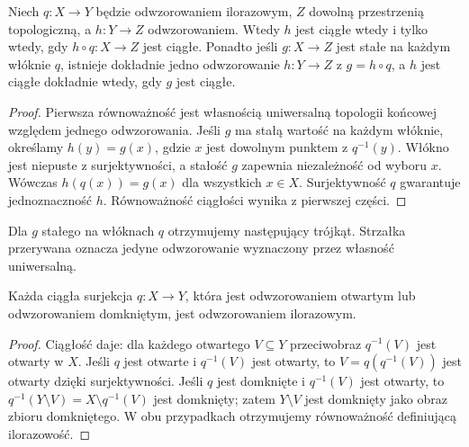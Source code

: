 \begin{twierdzenie}
\label{thm:topog-iloraz-uniwersalnosc}
Niech $q\colon X\to Y$ będzie odwzorowaniem ilorazowym,
$Z$ dowolną przestrzenią topologiczną, a $h\colon Y\to Z$
odwzorowaniem. Wtedy $h$ jest ciągłe wtedy i tylko wtedy,
gdy $h\circ q\colon X\to Z$ jest ciągłe.
Ponadto jeśli $g\colon X\to Z$ jest stałe na każdym
włóknie $q$, istnieje dokładnie jedno odwzorowanie
$h\colon Y\to Z$ z $g=h\circ q$, a $h$ jest ciągłe
dokładnie wtedy, gdy $g$ jest ciągłe.
\end{twierdzenie}


\begin{proof}
Pierwsza równoważność jest własnością uniwersalną
topologii końcowej względem jednego odwzorowania.
Jeśli $g$ ma stałą wartość na każdym włóknie, określamy
$h(y)=g(x)$, gdzie $x$ jest dowolnym punktem z
$q^{-1}(y)$. Włókno jest niepuste z surjektywności,
a stałość $g$ zapewnia niezależność od wyboru $x$.
Wówczas $h(q(x))=g(x)$ dla wszystkich $x\in X$.
Surjektywność $q$ gwarantuje jednoznaczność $h$.
Równoważność ciągłości wynika z pierwszej części.
\end{proof}

Dla $g$ stałego na włóknach $q$ otrzymujemy następujący trójkąt. Strzałka przerywana oznacza jedyne odwzorowanie wyznaczony przez własność uniwersalną.
\begin{center}
\end{center}

\begin{stwierdzenie}
\label{prop:topog-otwarta-surjekcja-iloraz}
Każda ciągła surjekcja $q\colon X\to Y$, która jest
odwzorowaniem otwartym lub odwzorowaniem domkniętym,
jest odwzorowaniem ilorazowym.
\end{stwierdzenie}
\begin{proof}
Ciągłość daje: dla każdego otwartego $V\subseteq Y$
przeciwobraz $q^{-1}(V)$ jest otwarty w $X$.
Jeśli $q$ jest otwarte i $q^{-1}(V)$ jest otwarty,
to $V=q(q^{-1}(V))$ jest otwarty dzięki surjektywności.
Jeśli $q$ jest domknięte i $q^{-1}(V)$ jest otwarty,
to $q^{-1}(Y\setminus V)=X\setminus q^{-1}(V)$
jest domknięty; zatem $Y\setminus V$ jest domknięty
jako obraz zbioru domkniętego. W obu przypadkach
otrzymujemy równoważność definiującą ilorazowość.
\end{proof}

